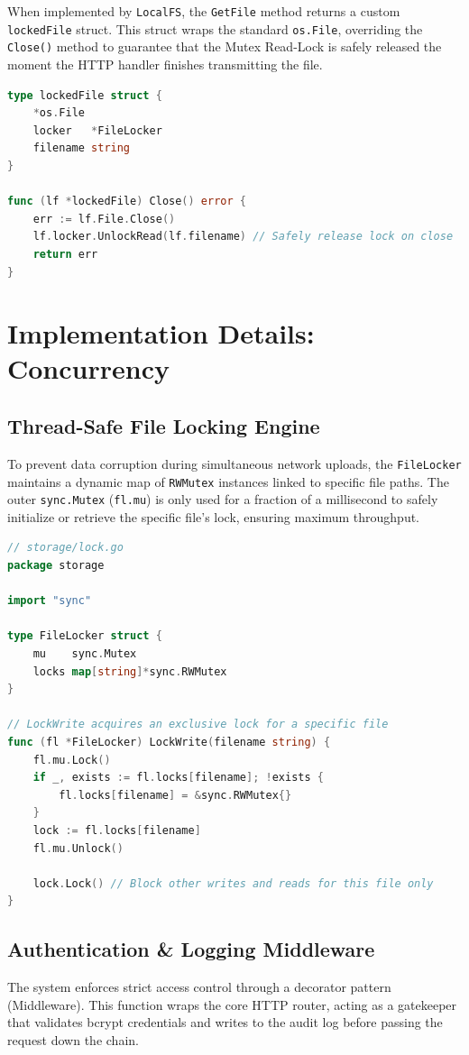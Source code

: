 \documentclass[12pt, a4paper]{article}
\begin{document}
When implemented by \texttt{LocalFS}, the \texttt{GetFile} method returns a custom \texttt{lockedFile} struct. This struct wraps the standard \texttt{os.File}, overriding the \texttt{Close()} method to guarantee that the Mutex Read-Lock is safely released the moment the HTTP handler finishes transmitting the file.

\begin{lstlisting}[language=Go]
type lockedFile struct {
	*os.File
	locker   *FileLocker
	filename string
}

func (lf *lockedFile) Close() error {
	err := lf.File.Close()
	lf.locker.UnlockRead(lf.filename) // Safely release lock on close
	return err
}
\end{lstlisting}

\newpage
\section{Implementation Details: Concurrency}

\subsection{Thread-Safe File Locking Engine}
To prevent data corruption during simultaneous network uploads, the \texttt{FileLocker} maintains a dynamic map of \texttt{RWMutex} instances linked to specific file paths. The outer \texttt{sync.Mutex} (\texttt{fl.mu}) is only used for a fraction of a millisecond to safely initialize or retrieve the specific file's lock, ensuring maximum throughput.

\begin{lstlisting}[language=Go]
// storage/lock.go
package storage

import "sync"

type FileLocker struct {
    mu    sync.Mutex
    locks map[string]*sync.RWMutex
}

// LockWrite acquires an exclusive lock for a specific file
func (fl *FileLocker) LockWrite(filename string) {
    fl.mu.Lock()
    if _, exists := fl.locks[filename]; !exists {
        fl.locks[filename] = &sync.RWMutex{}
    }
    lock := fl.locks[filename]
    fl.mu.Unlock()

    lock.Lock() // Block other writes and reads for this file only
}
\end{lstlisting}

\subsection{Authentication \& Logging Middleware}
The system enforces strict access control through a decorator pattern (Middleware). This function wraps the core HTTP router, acting as a gatekeeper that validates bcrypt credentials and writes to the audit log before passing the request down the chain.
\end{document}
